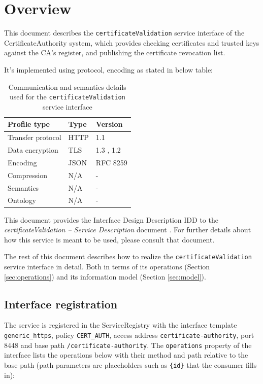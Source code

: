 \documentclass[a4paper]{arrowhead}
\begin{document}
\section{Overview}
\label{sec:overview}

This document describes the \texttt{certificate\allowbreak{}Validation} service interface of the CertificateAuthority system, which provides checking certificates and trusted keys against the CA's register, and publishing the certificate revocation list.

It's implemented using protocol, encoding as stated in below table:
\begin{table}[ht!]
  \centering
  \begin{tabular}{|l|l|l|}
    \hline
    \rowcolor{gray!33} Profile type & Type & Version \\ \hline
    Transfer protocol & HTTP & 1.1 \cite{rfc9112} \\ \hline
    Data encryption & TLS & 1.3 \cite{rfc8446}, 1.2 \cite{rfc5246} \\ \hline
    Encoding & JSON & RFC 8259 \cite{rfc8259} \\ \hline
    Compression & N/A & - \\ \hline
    Semantics & N/A & - \\ \hline
    Ontology & N/A & - \\ \hline
  \end{tabular}
  \caption{Communication and semantics details used for the \texttt{certificate\allowbreak{}Validation} service interface}
  \label{tab:comunication_semantics_profile}
\end{table}

This document provides the Interface Design Description IDD to the \textit{certificateValidation -- Service Description} document \cite{cau-certificateValidation-sd}.
For further details about how this service is meant to be used, please consult that document.

The rest of this document describes how to realize the \texttt{certificate\allowbreak{}Validation} service
interface in detail. Both in terms of its operations (Section \ref{sec:operations}) and its information model (Section \ref{sec:model}).

\subsection{Interface registration}

The service is registered in the ServiceRegistry with the interface template \texttt{generic\_\allowbreak{}https}, policy \texttt{CERT\_\allowbreak{}AUTH}, access address \texttt{certificate-\allowbreak{}authority}, port 8448 and base path \texttt{/\allowbreak{}certificate-\allowbreak{}authority}. The \texttt{operations} property of the interface lists the operations below with their method and path relative to the base path (path parameters are placeholders such as \texttt{\{id\}} that the consumer fills in):
\end{document}
